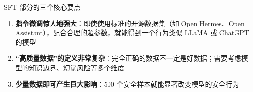 \begin{importantbox}{SFT 部分的三个核心要点}
\begin{enumerate}
    \item \textbf{指令微调惊人地强大}：即使使用标准的开源数据集（如 Open Hermes、Open Assistant），配合合理的超参数，就能得到一个行为类似 LLaMA 或 ChatGPT 的模型
    \item \textbf{``高质量数据''的定义非常复杂}：完全正确的数据不一定是好数据；需要考虑模型的知识边界、幻觉风险等多个维度
    \item \textbf{少量数据即可产生巨大影响}：500 个安全样本就能显著改变模型的安全行为
\end{enumerate}
\end{importantbox}


